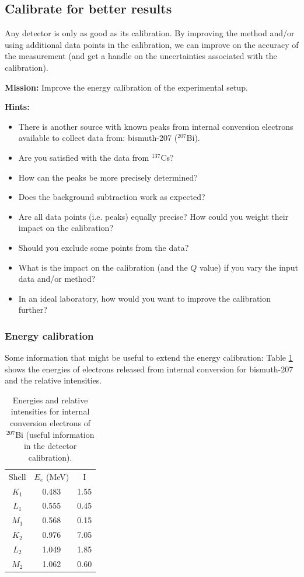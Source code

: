 \documentclass[a4,11pt, notitlepage]{article}
\begin{document}
\subsection{Calibrate for better results}
\label{sec:calibrate}

Any detector is only as good as its calibration. By improving the
method and/or using additional data points in the calibration, we can
improve on the accuracy of the measurement (and get a handle on the
uncertainties associated with the calibration).

\noindent\textbf{Mission:} Improve the energy calibration of the experimental setup.

\noindent\textbf{Hints:}
\begin{itemize}
\item There is another source with known peaks from internal
  conversion electrons available to collect data from: bismuth-207
  ($^{207}$Bi).
\item Are you satisfied with the data from $^{137}$Cs?
\item How can the peaks be more precisely determined?
\item Does the background subtraction work as expected?
\item Are all data points (i.e. peaks) equally precise? How could you
  weight their impact on the calibration?
\item Should you exclude some points from the data?
\item What is the impact on the calibration (and the $Q$ value) if you
  vary the input data and/or method?
\item In an ideal laboratory, how would you want to improve the
  calibration further?
\end{itemize}

\subsubsection{Energy calibration}
\label{sec:energy-calib}

Some information that might be useful to extend the energy
calibration: Table \ref{tab:calib} shows the energies of electrons released from
internal conversion for bismuth-207 and the relative intensities.

\begin{table}[h]
\caption{Energies and relative intensities for internal conversion
  electrons of $^{207}$Bi (useful information in the detector calibration).}
\label{tab:calib}
\centering
\begin{tabular}{ccc}
Shell & $E_{e}$ (MeV) & I \\
$K_1$ & 0.483 & 1.55 \\
$L_1$ & 0.555 & 0.45 \\
$M_1$ & 0.568 & 0.15 \\
$K_2$ & 0.976 & 7.05 \\
$L_2$ & 1.049 & 1.85 \\
$M_2$ & 1.062 & 0.60 
\end{tabular}
\end{table}
\end{document}
